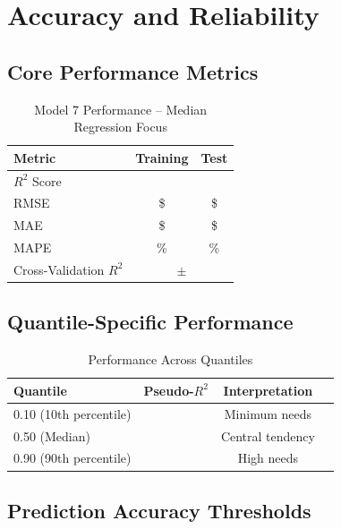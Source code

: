 \section{Accuracy and Reliability}

\subsection{Core Performance Metrics}

\begin{table}[h]
\centering
\caption{Model 7 Performance -- Median Regression Focus}
\begin{tabular}{lcc}
\toprule
\textbf{Metric} & \textbf{Training} & \textbf{Test} \\
\midrule
$R^2$ Score & \ModelSevenRSquaredTrain{} & \ModelSevenRSquaredTest{} \\
RMSE & \$\ModelSevenRMSETrain{} & \$\ModelSevenRMSETest{} \\
MAE & \$\ModelSevenMAETrain{} & \$\ModelSevenMAETest{} \\
MAPE & \ModelSevenMAPETrain{}\% & \ModelSevenMAPETest{}\% \\
Cross-Validation $R^2$ & \multicolumn{2}{c}{\ModelSevenCVMean{} $\pm$ \ModelSevenCVStd{}} \\
\bottomrule
\end{tabular}
\end{table}

\subsection{Quantile-Specific Performance}

\begin{table}[h]
\centering
\caption{Performance Across Quantiles}
\begin{tabular}{lccc}
\toprule
\textbf{Quantile} & \textbf{Pseudo-$R^2$} & \textbf{Interpretation} \\
\midrule
0.10 (10th percentile) & \ModelSevenQuantileTenRSquared{} & Minimum needs \\
0.50 (Median) & \ModelSevenRSquaredTest{} & Central tendency \\
0.90 (90th percentile) & \ModelSevenQuantileNinetyRSquared{} & High needs \\
\bottomrule
\end{tabular}
\end{table}

\subsection{Prediction Accuracy Thresholds}

